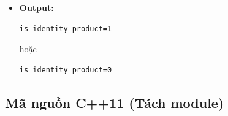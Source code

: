 \begin{itemize}
\begin{itemize}
        \item \textbf{Module 4 (Tạo ma trận đơn vị):}
        \begin{itemize}
            \item Đường chéo chính = $1/1$
            \item Ngoài đường chéo = $0/1$
        \end{itemize}

        \item \textbf{Module 5 (Nhân ma trận):}
        \begin{itemize}
            \item Tính $A \times I$
            \item Tính $I \times A$
        \end{itemize}

        \item \textbf{Module 6 (So sánh ma trận):}
        \begin{itemize}
            \item So sánh từng ô sau khi chuẩn hoá phân số
        \end{itemize}
    \end{itemize}

    \item \textbf{Output:}
\begin{lstlisting}
is_identity_product=1
\end{lstlisting}
hoặc
\begin{lstlisting}
is_identity_product=0
\end{lstlisting}

\end{itemize}

\subsection{Mã nguồn C++11 (Tách module)}

